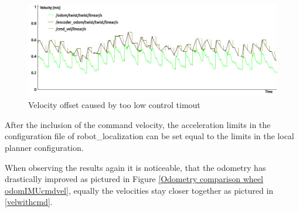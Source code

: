 \begin{figure} 
	\includegraphics[width=\textwidth]{Pictures/velocity comp}
	\caption{Velocity offset caused by too low control timout}
	\label{velocity offset}

\end{figure}

After the inclusion of the command velocity, the acceleration limits in the configuration file of robot\_localization can be set equal to the limits in the local planner configuration.

When observing the results again it is noticeable, that the odometry has drastically improved as pictured in Figure \ref{Odometry comparison wheel odomIMUcmdvel}, equally the velocities stay closer together as pictured in \ref{velwithcmd}.

